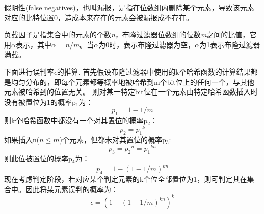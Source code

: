 \begin{definition}
	假阴性(false negatives)，也叫漏报，是指在位数组内删除某个元素，导致该元素对应的比特位置0，造成本来存在的元素会被漏报成不存在。
\end{definition}

\begin{definition}
	负载因子是指集合中的元素的个数\textit{n}，布隆过滤器位数组的位数\textit{m}之间的比值，它用\begin{math} \alpha \end{math}表示，其中\begin{math} \alpha  = {n/m} \end{math}。当\begin{math} \alpha \end{math}为0时，表示布隆过滤器为空，\begin{math} \alpha \end{math}为1表示布隆过滤器满载。
\end{definition}

下面进行误判率\begin{math}\epsilon\end{math}的推算.
首先假设布隆过滤器中使用的k个哈希函数的计算结果都是均匀分布的，即每个元素都等概率地被哈希到m个bit位上的任何一个，与其他元素被哈希到的位置无关。
则对某一特定bit位在一个元素由特定哈希函数插入时没有被置位为1的概率p$_1$为：
\begin{equation}
p_1 = 1-{1/m}
\end{equation}
则k个哈希函数中都没有一个对其置位的概率p$_2$：
\begin{equation}
p_2 = {p_1}^k
\end{equation}
如果插入n(\begin{math}n\leqslant m\end{math})个元素，但都未对其置位的概率p$_3$:
\begin{equation}
p_3 = {p_2}^n = {p_1}^{kn}
\end{equation}
则此位被置位的概率p$_4$为：
\begin{equation}
p_4 = 1 - \left(1 - {1/m}\right)^{kn}
\label{equ:alpha}
\end{equation}
现在考虑判定阶段，若对应某个判定元素的k个位全部置位为1，则可判定其在集合中。因此将某元素误判的概率为：
\begin{equation}
\epsilon = \left(1 - \left(1 - {1/m}\right)^{kn}\right)^k
\label{equ:epsilon}
\end{equation}


